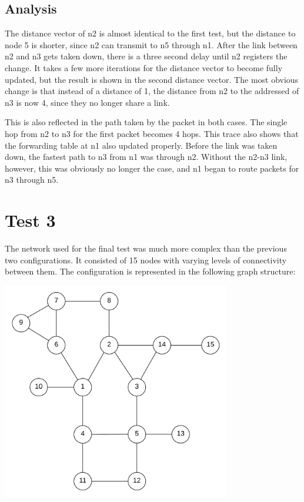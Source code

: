 \documentclass[fleqn,11pt]{article}
\begin{document}
	\subsection{Analysis}
	
	The distance vector of n2 is almost identical to the first test, but the distance to node 5 is shorter, since
	n2 can transmit to n5 through n1. After the link between n2 and n3 gets taken down, there is a three second delay until
	n2 registers the change. It takes a few more iterations for the distance vector to become fully updated, but the
	result is shown in the second distance vector. The most obvious change is that instead of a distance of 1, the
	distance from n2 to the addressed of n3 is now 4, since they no longer share a link.
	
	This is also reflected in the path taken by the packet in both cases. The single hop from n2 to n3 for the first
	packet becomes 4 hops. This trace also shows that the forwarding table at n1 also updated properly. Before the link
	was taken down, the fastest path to n3 from n1 was through n2. Without the n2-n3 link, however, this was obviously
	no longer the case, and n1 began to route packets for n3 through n5.
	
	\section{Test 3}
	
	The network used for the final test was much more complex than the previous two configurations. It consisted
	of 15 nodes with varying levels of connectivity between them. The configuration is represented in the
	following graph structure:
	
	\begin{center}
		\includegraphics[width=10cm]{15nodes}
	\end{center}
		
\end{document}
